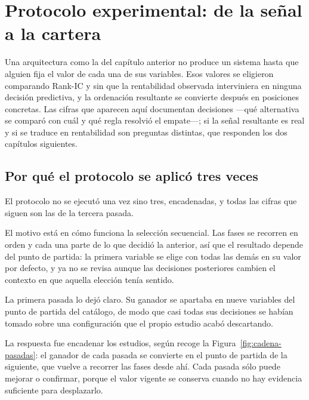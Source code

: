\chapter{Protocolo experimental: de la señal a la cartera}
\label{chap:diseno-experimental}

Una arquitectura como la del capítulo anterior no produce un sistema hasta que alguien fija el valor
de cada una de sus variables. Esos valores se eligieron comparando Rank-IC y sin que la rentabilidad
observada interviniera en ninguna decisión predictiva, y la ordenación resultante se convierte
después en posiciones concretas. Las cifras que aparecen aquí documentan decisiones
---qué alternativa se comparó con cuál y qué regla resolvió el empate---; si la señal resultante es
real y si se traduce en rentabilidad son preguntas distintas, que responden los dos capítulos
siguientes.

\section{Por qué el protocolo se aplicó tres veces}
\label{sec:cadena-studies}

El protocolo no se ejecutó una vez sino tres, encadenadas, y todas las cifras que siguen son las de
la tercera pasada.

El motivo está en cómo funciona la selección secuencial. Las fases se recorren en orden y cada una
parte de lo que decidió la anterior, así que el resultado depende del punto de partida: la primera
variable se elige con todas las demás en su valor por defecto, y ya no se revisa aunque las
decisiones posteriores cambien el contexto en que aquella elección tenía sentido.

La primera pasada lo dejó claro. Su ganador se apartaba en nueve variables del punto de
partida del catálogo, de modo que casi todas sus decisiones se habían tomado sobre una
configuración que el propio estudio acabó descartando.

La respuesta fue encadenar los estudios, según recoge la Figura~\ref{fig:cadena-pasadas}: el ganador
de cada pasada se convierte en el punto de partida de la siguiente, que vuelve a recorrer las fases
desde ahí. Cada pasada sólo puede mejorar o confirmar, porque el valor vigente se conserva cuando no
hay evidencia suficiente para desplazarlo.

